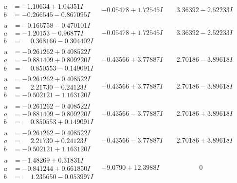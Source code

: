 \documentclass[1p]{elsarticle_modified}
\theoremstyle{definition}
\begin{document}
$$\begin{array}{c|c|c}
\begin{aligned}
a &= -1.10634 + 1.04351 I \\
b &= -0.266545 - 0.867095 I\end{aligned}
 & -0.05478 + 1.72545 I & \phantom{-}3.36392 - 2.52233 I \\ \hline\begin{aligned}
u &= -0.166758 - 0.470101 I \\
a &= -1.20153 - 0.96877 I \\
b &= \phantom{-}0.368166 - 0.304402 I\end{aligned}
 & -0.05478 + 1.72545 I & \phantom{-}3.36392 - 2.52233 I \\ \hline\begin{aligned}
u &= -0.261262 + 0.408522 I \\
a &= -0.881409 + 0.809220 I \\
b &= \phantom{-}0.850553 - 0.149091 I\end{aligned}
 & -0.43566 + 3.77887 I & \phantom{-}2.70186 - 3.89618 I \\ \hline\begin{aligned}
u &= -0.261262 + 0.408522 I \\
a &= \phantom{-}2.21730 - 0.24123 I \\
b &= -0.502121 - 1.163120 I\end{aligned}
 & -0.43566 + 3.77887 I & \phantom{-}2.70186 - 3.89618 I \\ \hline\begin{aligned}
u &= -0.261262 - 0.408522 I \\
a &= -0.881409 - 0.809220 I \\
b &= \phantom{-}0.850553 + 0.149091 I\end{aligned}
 & -0.43566 - 3.77887 I & \phantom{-}2.70186 + 3.89618 I \\ \hline\begin{aligned}
u &= -0.261262 - 0.408522 I \\
a &= \phantom{-}2.21730 + 0.24123 I \\
b &= -0.502121 + 1.163120 I\end{aligned}
 & -0.43566 - 3.77887 I & \phantom{-}2.70186 + 3.89618 I \\ \hline\begin{aligned}
u &= -1.48269 + 0.31831 I \\
a &= -0.841244 + 0.661850 I \\
b &= \phantom{-}1.235650 - 0.053997 I\end{aligned}
 & -9.0790 + 12.3988 I & \phantom{-0.000000 } 0 \\ \hline\begin{aligned}

\end{aligned}
\end{array}$$
\end{document}
